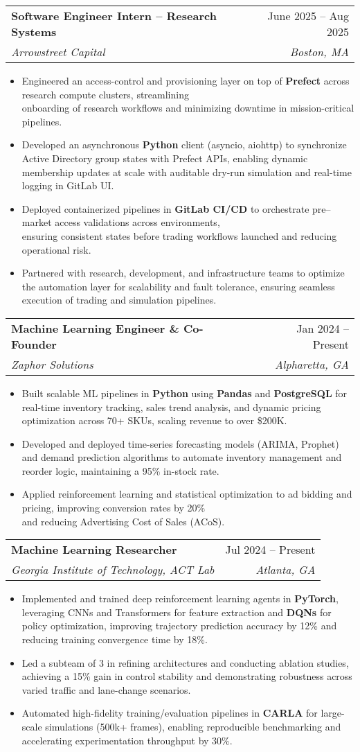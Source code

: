 \documentclass[letterpaper,10pt]{article}
\makeatletter
\newcommand{\resumeItem}[1]{\item\small{{#1 \vspace{-2pt}}}}
\newcommand{\resumeItemListEnd}{\end{itemize}\vspace{-6pt}}
\newcommand{\resumeSubheading}[4]{
  \vspace{-2pt}\item
    \begin{tabular*}{0.97\textwidth}[t]{l@{\extracolsep{\fill}}r}
      \textbf{#1} & #2 \\
      \textit{\small#3} & \textit{\small #4} \\
    \end{tabular*}\vspace{-7pt}
}
\newcommand{\resumeItemListStart}{\begin{itemize}}
\makeatother
\begin{document}
  \resumeSubheading
  {Software Engineer Intern – Research Systems}{June 2025 -- Aug 2025}
  {Arrowstreet Capital}{Boston, MA}
  \resumeItemListStart
    \resumeItem{Engineered an access-control and provisioning layer on top of \textbf{Prefect} across research compute clusters, streamlining \\ onboarding of research workflows and minimizing downtime in mission-critical pipelines.}
    \resumeItem{Developed an asynchronous \textbf{Python} client (asyncio, aiohttp) to synchronize Active Directory group states with Prefect APIs, enabling dynamic membership updates at scale with auditable dry-run simulation and real-time logging in GitLab UI.}
    \resumeItem{Deployed containerized pipelines in \textbf{GitLab CI/CD} to orchestrate pre–market access validations across environments, \\ensuring consistent states before trading workflows launched and reducing operational risk.}
    \resumeItem{Partnered with research, development, and infrastructure teams to optimize the automation layer for scalability and fault tolerance, ensuring seamless execution of trading and simulation pipelines.}
  \resumeItemListEnd

  \resumeSubheading
  {Machine Learning Engineer \& Co-Founder}{Jan 2024 -- Present}
  {Zaphor Solutions}{Alpharetta, GA}
  \resumeItemListStart
    \resumeItem{Built scalable ML pipelines in \textbf{Python} using \textbf{Pandas} and \textbf{PostgreSQL} for real-time inventory tracking, sales trend analysis, and dynamic pricing optimization across 70+ SKUs, scaling revenue to over \$200K.}
    \resumeItem{Developed and deployed time-series forecasting models (ARIMA, Prophet) and demand prediction algorithms to automate inventory management and reorder logic, maintaining a 95\% in-stock rate.}
    \resumeItem{Applied reinforcement learning and statistical optimization to ad bidding and pricing, improving conversion rates by 20\% \\and reducing Advertising Cost of Sales (ACoS).}
  \resumeItemListEnd

  \resumeSubheading
  {Machine Learning Researcher}{Jul 2024 -- Present}
  {Georgia Institute of Technology, ACT Lab}{Atlanta, GA}
  \resumeItemListStart
    \resumeItem{Implemented and trained deep reinforcement learning agents in \textbf{PyTorch}, leveraging CNNs and Transformers for feature extraction and \textbf{DQNs} for policy optimization, improving trajectory prediction accuracy by 12\% and reducing training convergence time by 18\%.}
    \resumeItem{Led a subteam of 3 in refining architectures and conducting ablation studies, achieving a 15\% gain in control stability and demonstrating robustness across varied traffic and lane-change scenarios.}
    \resumeItem{Automated high-fidelity training/evaluation pipelines in \textbf{CARLA} for large-scale simulations (500k+ frames), enabling reproducible benchmarking and accelerating experimentation throughput by 30\%.}
  \resumeItemListEnd
\end{document}
